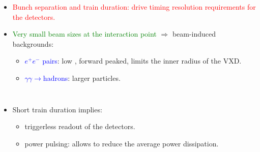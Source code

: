 \begin{frame}
\begin{columns}
    \centering

    \centering
    \begin{itemize}
    \item \textcolor{red}{Bunch separation and train duration: drive timing resolution requirements for the detectors.}
    \item \textcolor{green}{Very small beam sizes at the interaction
        point} $\Rightarrow$ beam-induced backgrounds:
      \begin{itemize}
      \item \textcolor{blue}{$e^{+}e^{-}$ pairs}: low \pT, forward peaked, limits the inner radius of the VXD.
      \item \textcolor{blue}{$\gamma\gamma\rightarrow$hadrons}: larger \pT particles.
      \end{itemize}      
    \end{itemize}

  \end{columns}

  \begin{itemize}
  \item Short train duration implies:
    \begin{itemize}
    \item triggerless readout of the detectors.
    \item power pulsing: allows to reduce the average power dissipation.
    \end{itemize}
  \end{itemize}

\end{frame}

